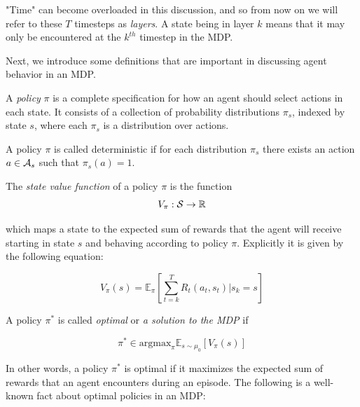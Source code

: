 "Time" can become overloaded in this discussion, and so from now on we will refer to these $T$ timesteps as {\em layers}. A state being in layer $k$ means that it may only be encountered at the $k^{th}$ timestep in the MDP.

Next, we introduce some definitions that are important in discussing agent behavior in an MDP. 

\begin{mydef}
A {\em policy} $\pi$ is a complete specification for how an agent should select actions in each state. It consists of a collection of probability distributions $\pi_s$, indexed by state $s$, where each $\pi_s$ is a distribution over actions.
\label{mydef:policy}
\end{mydef}

\begin{mydef}
A policy $\pi$ is called deterministic if for each distribution $\pi_s$ there exists an action $a \in \AA_s$ such that $\pi_s(a) = 1$. 
\label{mydef:detpolicy}
\end{mydef}

\begin{mydef}
The {\em state value function} of a policy $\pi$ is the function
\begin{equation}
V_{\pi} : \SS \rightarrow \R
\label{mydef:vfinout}
\end{equation}

which maps a state to the expected sum of rewards that the agent will receive starting in state $s$ and behaving according to policy $\pi$. Explicitly it is given by the following equation:

\begin{equation}
V_{\pi}(s) = \mathbb{E}_{\pi}\left[\sum_{t=k}^T R_t(a_t,s_t) | s_k = s\right]
\label{eq:vfexpectation}
\end{equation}

\label{mydef:vf}
\end{mydef}


\begin{mydef}
A policy $\pi^*$ is called {\em optimal} or {\em a solution to the MDP} if

$$
\pi^* \in \text{argmax}_{\pi} \mathbb{E}_{s \sim \mu_0}\left[ V_{\pi}(s) \right]
$$
\end{mydef}

In other words, a policy $\pi^*$ is optimal if it maximizes the expected sum of rewards that an agent encounters during an episode. The following is a well-known fact about optimal policies in an MDP:

